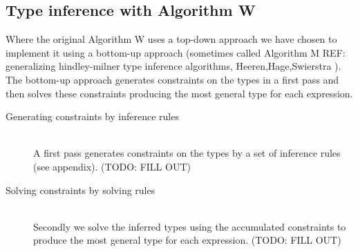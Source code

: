 \subsection{Type inference with Algorithm W}

Where the original Algorithm W uses a top-down approach we have chosen to implement it using a bottom-up approach (sometimes called Algorithm M REF: generalizing hindley-milner type inference algorithms, Heeren,Hage,Swierstra ). The bottom-up approach generates constraints on the types in a first pass and then solves these constraints producing the most general type for each expression.

\begin{description}
  \item[Generating constraints by inference rules] \hfill \\
A first pass generates constraints on the types by a set of inference rules (see appendix). (TODO: FILL OUT)
  \item[Solving constraints by solving rules] \hfill \\
Secondly we solve the inferred types using the accumulated constraints to produce the most general type for each expression. (TODO: FILL OUT)
\end{description}
